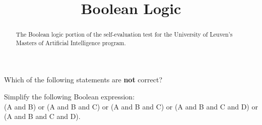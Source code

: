\documentclass{ximera}
\title{Boolean Logic}
\begin{document}
\begin{abstract}
The Boolean logic portion of the self-evaluation test for the
University of Leuven's Masters of Artificial Intelligence program.
\end{abstract}
\maketitle


\begin{question}
Which of the following statements are \textbf{not} correct?
\begin{solution}
\begin{multiple-choice}
\end{multiple-choice}
\end{solution}
\end{question}

\begin{question}
Simplify the following Boolean expression: \\
(A and B) or (A and B and C) or (A and B and C) or (A and B and C and D) or (A and B and C and D).
\begin{solution}
\begin{multiple-choice}
\end{multiple-choice}
\end{solution}
\end{question}
\end{document}
